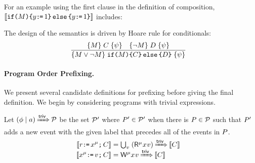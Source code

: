 For an example using the first clause in the definition of composition,
 $\llbracket\texttt{if}\allowbreak\texttt{(}M\texttt{)}\allowbreak\texttt{\{} y\texttt{:}\mkern-1mu\texttt{=}\,1 \texttt{\}}\,\allowbreak\texttt{else}\allowbreak\,\texttt{\{} y\texttt{:}\mkern-1mu\texttt{=}\,1\texttt{\}}\rrbracket$ includes:
\begin{tikzdisplay}[node distance=1em]
\end{tikzdisplay}

The design of the semantics is driven by Hoare rule for conditionals:
\begin{displaymath}
  \frac{
    \{M\}\allowbreak\;C\;\allowbreak\{\psi\}
    \quad
    \{\lnot M\}\allowbreak\;D\;\allowbreak\{\psi\}
  }{
    \{M\lor \lnot M\}\allowbreak\;\texttt{if}\allowbreak\texttt{(}M\texttt{)}\allowbreak\texttt{\{} C \texttt{\}}\,\allowbreak\texttt{else}\allowbreak\,\texttt{\{} D\texttt{\}}\;\allowbreak\{\psi\}
  }
\end{displaymath}



\paragraph{Program Order Prefixing.} %
We present several candidate definitions for prefixing before giving the
final definition.  We begin by considering programs with trivial expressions.

\begin{candidate}
  \label{def:rw:sc1}
  Let $(\phi \mid a) \mathbin{{\xRightarrow{{\mathsf{triv}}}}} \mathcal{P}$ be the set $\mathcal{P}'$ where
  $P'\in\mathcal{P}'$ when there is $P\in\mathcal{P}$ such that $P'$ adds a
  new event with the given label that precedes all of the events in $P$.
  \begin{align*}
    \sem{\aReg\GETS\aLoc^\amode\SEMI \aCmd} & =
    \smash{\textstyle\bigcup_\aVal\; (\DRmode\aLoc\aVal) \prefixsimp \sem{\aCmd}}
    \\
    \sem{\aLoc^\amode\GETS\aVal\SEMI \aCmd} & =
    \smash{\DWmode\aLoc\aVal \prefixsimp \sem{\aCmd}}
  \end{align*}
\end{candidate}


